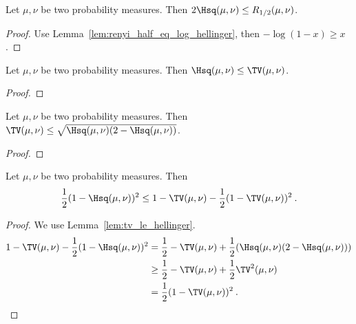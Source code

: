 \begin{lemma}
  \label{lem:hellinger_le_renyi}
  Let $\mu, \nu$ be two probability measures. Then $2 \Hsq(\mu, \nu) \le R_{1/2}(\mu, \nu)$.
\end{lemma}

\begin{proof}
Use Lemma~\ref{lem:renyi_half_eq_log_hellinger}, then $-\log(1 - x) \ge x$.
\end{proof}

\begin{lemma}
  \label{lem:hellinger_le_tv}
  Let $\mu, \nu$ be two probability measures. Then $\Hsq(\mu, \nu) \le \TV(\mu, \nu)$.
\end{lemma}

\begin{proof}
\end{proof}

\begin{lemma}
  \label{lem:tv_le_hellinger}
  Let $\mu, \nu$ be two probability measures. Then $\TV(\mu, \nu) \le \sqrt{\Hsq(\mu, \nu)(2 - \Hsq(\mu, \nu))}$.
\end{lemma}

\begin{proof}
\end{proof}

\begin{corollary}
  \label{cor:one_sub_hellinger_squared_le_one_sub_tv}
  Let $\mu, \nu$ be two probability measures. Then
  \begin{align*}
  \frac{1}{2}(1 - \Hsq(\mu, \nu))^2 \le 1 - \TV(\mu, \nu) - \frac{1}{2}(1 - \TV(\mu, \nu))^2
  \: .
  \end{align*}
\end{corollary}

\begin{proof}
We use Lemma~\ref{lem:tv_le_hellinger}.
\begin{align*}
1 - \TV(\mu, \nu) - \frac{1}{2}(1 - \Hsq(\mu, \nu))^2
&= \frac{1}{2} - \TV(\mu, \nu) + \frac{1}{2}(\Hsq(\mu, \nu)(2 - \Hsq(\mu, \nu)))
\\
&\ge \frac{1}{2} - \TV(\mu, \nu) + \frac{1}{2}\TV^2(\mu, \nu)
\\
&= \frac{1}{2}(1 - \TV(\mu, \nu))^2
\: .
\end{align*}
\end{proof}

